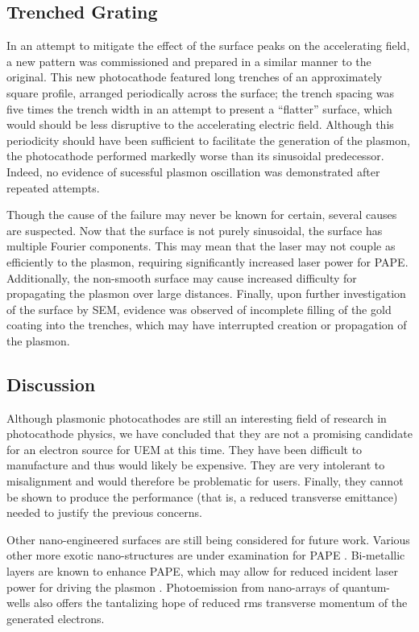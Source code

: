 \subsection{Trenched Grating}

In an attempt to mitigate the effect of the surface peaks on the accelerating field, a new pattern was commissioned and prepared in a similar manner to the original.
This new photocathode featured long trenches of an approximately square profile, arranged periodically across the surface; the trench spacing was five times the trench width in an attempt to present a ``flatter'' surface, which would should be less disruptive to the accelerating electric field.
Although this periodicity should have been sufficient to facilitate the generation of the plasmon, the photocathode performed markedly worse than its sinusoidal predecessor.
Indeed, no evidence of sucessful plasmon oscillation was demonstrated after repeated attempts.

Though the cause of the failure may never be known for certain, several causes are suspected.
Now that the surface is not purely sinusoidal, the surface has multiple Fourier components.
This may mean that the laser may not couple as efficiently to the plasmon, requiring significantly increased laser power for PAPE. 
Additionally, the non-smooth surface may cause increased difficulty for propagating the plasmon over large distances.
Finally, upon further investigation of the surface by SEM, evidence was observed of incomplete filling of the gold coating into the trenches, which may have interrupted creation or propagation of the plasmon.

\subsection{Discussion}

Although plasmonic photocathodes are still an interesting field of research in photocathode physics, we have concluded that they are not a promising candidate for an electron source for UEM at this time.
They have been difficult to manufacture and thus would likely be expensive.
They are very intolerant to misalignment and would therefore be problematic for users.
Finally, they cannot be shown to produce the performance (that is, a reduced transverse emittance) needed to justify the previous concerns.

Other nano-engineered surfaces are still being considered for future work.
Various other more exotic nano-structures are under examination for PAPE \cite{li_surface_2013,polyakov_plasmon_2013}.
Bi-metallic layers are known to enhance PAPE, which may allow for reduced incident laser power for driving the plasmon \cite{kupersztych_anomalous_2005}.
Photoemission from nano-arrays of quantum-wells also offers the tantalizing hope of reduced rms transverse momentum of the generated electrons.

